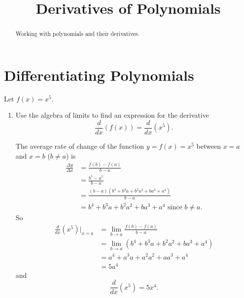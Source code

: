 \documentclass{ximera}
\title{Derivatives of Polynomials}
\begin{document}
\begin{abstract}
Working with polynomials and their derivatives.
\end{abstract}
\maketitle

\section{Differentiating Polynomials}

\begin{question}  \label{Qdst4hbbh}

Let $f(x)=x^5$. 

\begin{enumerate}
\item Use the algebra of limits to find an expression for the derivative 
\[
     \frac{d}{dx}(f(x)) =   \frac{d}{dx}\left( x^5 \right) .
\]

\begin{explanation}
The average rate of change of the function $y = f(x)=x^5$ between $x=a$ and $x=b$ ($b\neq a$) is
\begin{align*}
   \frac{\Delta y}{\Delta x}  &= \frac{f(b)-f(a)}{b-a}  \\
                                        &= \frac{b^5 - a^5}{b-a} \\
                                        &= \frac{(b-a)(b^4 + b^3a + b^2a^2 + ba^3 + a^4)}{b-a} \\
                                        &= b^4 + b^3a + b^2a^2 + ba^3 + a^4 \text{ since } b\neq a.
\end{align*}
So
\begin{align*}
       \frac{d}{dx}\left( x^5  \right)\Big|_{x=a} &= \lim_{b \to a} \frac{f(b)-f(a)}{b-a}  \\
                                                                    &= \lim_{b\to a} (  b^4 + b^3a + b^2a^2 + ba^3 + a^4 ) \\
                                                                    &= a^4 + a^3 a + a^2 a^2 + a a^3 +a^4  \\
                                                                    &= 5a^4 
\end{align*}
and 
\[
           \frac{d}{dx}\left( x^5 \right) = 5x^4 .
\]

\end{explanation}


\end{enumerate}
\end{question}
\end{document}
